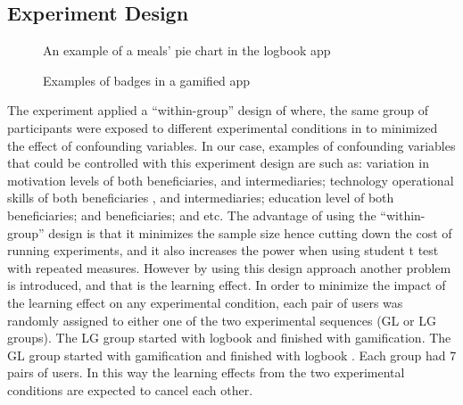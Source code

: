 \documentclass{sig-alternate}
\begin{document}
\subsection{Experiment Design}
\begin{figure}
\centering
{}
\caption{An example of a meals' pie chart in the logbook app}
\label{figure:logbookapp}
\end{figure}
\begin{figure}
\centering
{}
\caption{Examples of badges in a gamified app}
\label{figure:gameapp}
\end{figure}   
The experiment applied a ``within-group'' design of where, the same group of participants were exposed to different experimental conditions in to minimized the effect of confounding variables. In our case, examples of confounding variables that could be controlled with this experiment design are such as: variation in motivation levels of both beneficiaries, and intermediaries; technology operational skills of both beneficiaries , and intermediaries; education level of both beneficiaries; and beneficiaries; and etc. The advantage of using the ``within-group'' design is that it minimizes the sample size hence cutting down the cost of running experiments, and it also increases the power when using student t test with repeated measures. However by using this design approach another problem is introduced, and that is the learning effect. In order to minimize the impact of the learning effect on any experimental condition, each pair of users was randomly assigned to either one of the two experimental sequences (GL or LG groups). The LG group started with logbook and finished with gamification. The  GL group started with gamification and finished with logbook . Each group had 7 pairs of users. In this way the learning effects from the two experimental conditions are expected to cancel each other.  
\end{document}
